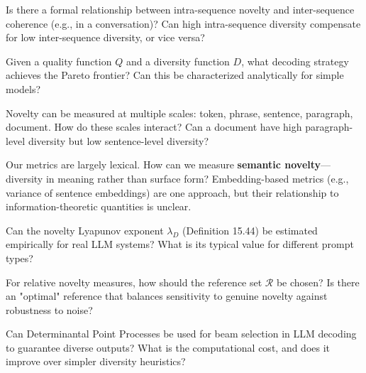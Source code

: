 \begin{question}
Is there a formal relationship between intra-sequence novelty and inter-sequence coherence (e.g., in a conversation)? Can high intra-sequence diversity compensate for low inter-sequence diversity, or vice versa?
\end{question}

\begin{question}
Given a quality function $Q$ and a diversity function $D$, what decoding strategy achieves the Pareto frontier? Can this be characterized analytically for simple models?
\end{question}

\begin{question}
Novelty can be measured at multiple scales: token, phrase, sentence, paragraph, document. How do these scales interact? Can a document have high paragraph-level diversity but low sentence-level diversity?
\end{question}

\begin{question}
Our metrics are largely lexical. How can we measure \textbf{semantic novelty}---diversity in meaning rather than surface form? Embedding-based metrics (e.g., variance of sentence embeddings) are one approach, but their relationship to information-theoretic quantities is unclear.
\end{question}

\begin{question}
Can the novelty Lyapunov exponent $\lambda_D$ (Definition 15.44) be estimated empirically for real LLM systems? What is its typical value for different prompt types?
\end{question}

\begin{question}
For relative novelty measures, how should the reference set $\mathcal{R}$ be chosen? Is there an "optimal" reference that balances sensitivity to genuine novelty against robustness to noise?
\end{question}

\begin{question}
Can Determinantal Point Processes be used for beam selection in LLM decoding to guarantee diverse outputs? What is the computational cost, and does it improve over simpler diversity heuristics?
\end{question}

